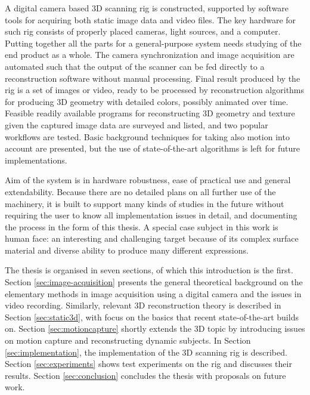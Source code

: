 
A digital camera based 3D scanning rig is constructed, supported by software tools for acquiring both static image data and video files.
The key hardware for such rig consists of properly placed cameras, light sources, and a computer.
Putting together all the parts for a general-purpose system needs studying of the end product as a whole.
The camera synchronization and image acquisition are automated such that the output of the scanner can be fed directly to a reconstruction software without manual processing.
Final result produced by the rig is a set of images or video, ready to be processed by reconstruction algorithms for producing 3D geometry with detailed colors, possibly animated over time.
Feasible readily available programs for reconstructing 3D geometry and texture given the captured image data are surveyed and listed, and two popular workflows are tested.
Basic background techniques for taking also motion into account are presented, but the use of state-of-the-art algorithms is left for future implementations.


Aim of the system is in hardware robustness, ease of practical use and general extendability.
Because there are no detailed plans on all further use of the machinery, it is built to support many kinds of studies in the future without requiring the user to know all implementation issues in detail, and documenting the process in the form of this thesis.
A special case subject in this work is human face: an interesting and challenging target because of its complex surface material and diverse ability to produce many different expressions.


The thesis is organised in seven sections, of which this introduction is the first.
Section \ref{sec:image-acquisition} presents the general theoretical background on the elementary methods in image acquisition using a digital camera and the issues in video recording.
Similarly, relevant 3D reconstruction theory is described in Section \ref{sec:static3d}, with focus on the basics that recent state-of-the-art builds on.
Section \ref{sec:motioncapture} shortly extends the 3D topic by introducing issues on motion capture and reconstructing dynamic subjects.
In Section \ref{sec:implementation}, the implementation of the 3D scanning rig is described.
Section \ref{sec:experiments} shows test experiments on the rig and discusses their results.
Section \ref{sec:conclusion} concludes the thesis with proposals on future work.
